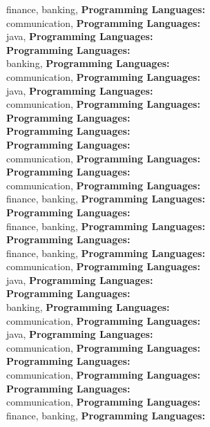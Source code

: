 finance, banking, \textbf{Programming Languages:} \\
communication, \textbf{Programming Languages:} \\
java, \textbf{Programming Languages:} \\
\textbf{Programming Languages:} \\
banking, \textbf{Programming Languages:} \\
communication, \textbf{Programming Languages:} \\
java, \textbf{Programming Languages:} \\
communication, \textbf{Programming Languages:} \\
\textbf{Programming Languages:} \\
\textbf{Programming Languages:} \\
\textbf{Programming Languages:} \\
communication, \textbf{Programming Languages:} \\
\textbf{Programming Languages:} \\
communication, \textbf{Programming Languages:} \\
finance, banking, \textbf{Programming Languages:} \\
\textbf{Programming Languages:} \\
finance, banking, \textbf{Programming Languages:} \\
\textbf{Programming Languages:} \\
finance, banking, \textbf{Programming Languages:} \\
communication, \textbf{Programming Languages:} \\
java, \textbf{Programming Languages:} \\
\textbf{Programming Languages:} \\
banking, \textbf{Programming Languages:} \\
communication, \textbf{Programming Languages:} \\
java, \textbf{Programming Languages:} \\
communication, \textbf{Programming Languages:} \\
\textbf{Programming Languages:} \\
communication, \textbf{Programming Languages:} \\
\textbf{Programming Languages:} \\
communication, \textbf{Programming Languages:} \\
finance, banking, \textbf{Programming Languages:} \\
